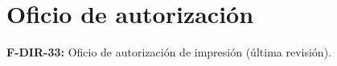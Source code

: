 \section{Oficio de autorización}

\textbf{F-DIR-33:} Oficio de autorización de impresión (última revisión).

\newpage